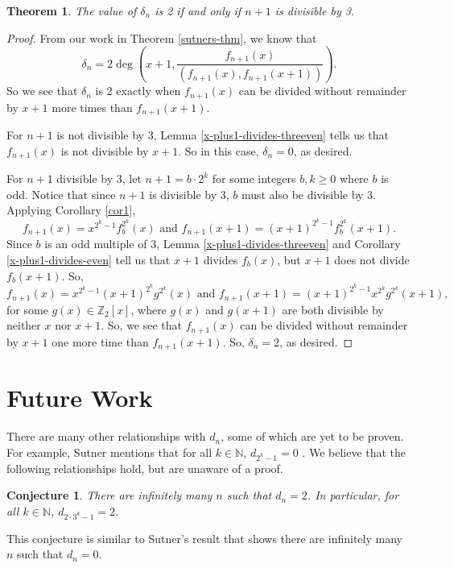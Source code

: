 \documentclass[a4paper]{article}
\newtheorem{theorem}{Theorem}
\newtheorem{conjecture}{Conjecture}
\newcommand{\Z}{\mathbb{Z}}
\newcommand{\N}{\mathbb{N}}
\begin{document}
	\begin{theorem}\label{when-is-deltan-2}
		The value of $\delta_n$ is 2 if and only if $n+1$ is divisible by 3.
	\end{theorem}
	\begin{proof}
		From our work in Theorem \ref{sutners-thm}, we know that
		\begin{equation*}
			\delta_n = 2\deg\left(x+1,\frac{f_{n+1}(x)}{(f_{n+1}(x),f_{n+1}(x+1))}\right).
		\end{equation*}
		So we see that $\delta_n$ is 2 exactly when $f_{n+1}(x)$ can be divided without remainder by $x+1$ more times than $f_{n+1}(x+1)$.
		
		For $n+1$ is not divisible by 3, Lemma \ref{x-plus1-divides-threeven} tells us that $f_{n+1}(x)$ is not divisible by $x+1$.
		So in this case, $\delta_n = 0$, as desired.
		
		For $n+1$ divisible by 3, let $n+1 = b \cdot 2^k$ for some integers $b, k \geq 0$ where $b$ is odd.
		Notice that since $n+1$ is divisible by 3, $b$ must also be divisible by 3.
		Applying Corollary \ref{cor1},
		\begin{equation*}
			f_{n+1}(x) = x^{2^k - 1}f_{b}^{2^k}(x) \text{ and } f_{n+1}(x+1) = (x+1)^{2^k - 1}f_{b}^{2^k}(x+1).
		\end{equation*}
		Since $b$ is an odd multiple of 3, Lemma \ref{x-plus1-divides-threeven} and Corollary \ref{x-plus1-divides-even} tell us that $x+1$ divides $f_b(x)$, but $x+1$ does not divide $f_b(x+1)$.
		So,
		\begin{equation*}
			f_{n+1}(x) = x^{2^k - 1}(x+1)^{2^k}g^{2^k}(x) \text{ and } f_{n+1}(x+1) = (x+1)^{2^k - 1}x^{2^k}g^{2^k}(x+1),
		\end{equation*} 
		for some $g(x) \in \Z_2[x]$, where $g(x)$ and $g(x+1)$ are both divisible by neither $x$ nor $x+1$.
		So, we see that $f_{n+1}(x)$ can be divided without remainder by $x+1$ one more time than $f_{n+1}(x+1)$.
		So, $\delta_n = 2$, as desired.
	\end{proof}

	\section{Future Work}
	There are many other relationships with $d_n$, some of which are yet to be proven.
	For example, Sutner mentions that for all $k \in \N$, $d_{2^k - 1} = 0$ \cite{Sutner1989}.
	We believe that the following relationships hold, but are unaware of a proof.
	
	\begin{conjecture}\label{conj-all-2}
		There are infinitely many $n$ such that $d_n = 2$.
		In particular, for all $k \in \N$, $d_{2\cdot 3^{k} - 1} = 2$.
	\end{conjecture}
	This conjecture is similar to Sutner's result that shows there are infinitely many $n$ such that $d_n = 0$.
	
\end{document}
